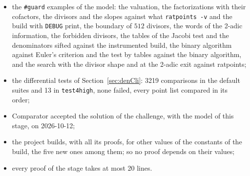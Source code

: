 \begin{itemize}
    for the result of the subtraction loop of the Jacobi symbol, the part of a number prime to
    another as a definition, unfolding lemmas for the tests, the lemmas of Mathlib's generality in
    their homes and at their generality, the weakest hypotheses, and names from the statements;
  \item the \verb|#guard| examples of the model: the valuation, the factorizations with their
    cofactors, the divisors and the slopes against what \verb|ratpoints -v| and the build with
    \verb|DEBUG| print, the boundary of $512$ divisors, the words of the 2-adic information, the
    forbidden divisors, the tables of the Jacobi test and the denominators sifted against the
    instrumented build, the binary algorithm against Euler's criterion and the test by tables
    against the binary algorithm, and the search with the divisor shape and at the 2-adic exit
    against ratpoints;
  \item the differential tests of Section~\ref{sec:denCli}: 3219 comparisons in the default suites
    and 13 in \verb|test4high|, none failed, every point list compared in its order;
  \item Comparator accepted the solution of the challenge, with the model of this stage, on
    2026-10-12;
  \item the project builds, with all its proofs, for other values of the constants of the build, the
    five new ones among them; so no proof depends on their values;
  \item every proof of the stage takes at most 20 lines.
\end{itemize}
